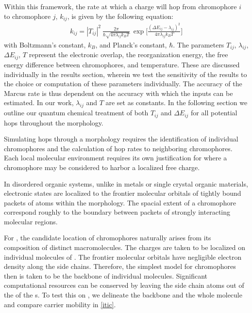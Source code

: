 Within this framework, the rate at which a charge will hop from chromophore $i$ to chromophore $j$, $k_{ij}$,
is given by the following equation:
\begin{align}
    k_{ij}  =  |T_{ij}|^2\ \frac{2\pi}{\hbar \sqrt{4 \pi \lambda_{ij} k_{B} T}}\ \exp{\Bigg[ \frac{(\Delta
    E_{ij} - \lambda_{ij})^2}{ 4 \pi \lambda_{ij} k_{B} T} \Bigg] }
    \label{marcus}
\end{align}
with Boltzmann's constant, $k_{B}$, and Planck's constant, $\hbar$. The parameters $T_{ij}$, $\lambda_{ij}$,
$\Delta E_{ij}$, $T$ represent the electronic overlap, the reorganization energy, the free energy difference
between chromophores, and
temperature. These are discussed individually in the results section, wherein we test the sensitivity of
the  results to the choice or computation of these parameters individually.
The accuracy of the Marcus rate is thus dependent on the accuracy with which the inputs can be estimated. In
our work, $\lambda_{ij}$ and $T$ are set as constants. In
the following section we outline our quantum chemical treatment of both $T_{ij}$ and $\Delta E_{ij}$ for all
potential hops throughout the morphology.

Simulating hops through a morphology requires the identification of
individual chromophores and the calculation of hop rates to neighboring
chromophores. 
Each local molecular environment requires its own justification for where a chromophore 
may be considered to harbor a localized free charge.

In disordered organic systems, unlike in metals or single crystal organic materials, 
electronic states are localized to the frontier molecular orbitals of tightly
bound packets of atoms within the morphology. 
The spacial extent of a chromophore
correspond roughly to the boundary between packets of strongly interacting molecular regions.

For , the candidate location of chromophores naturally arises from its composition of distinct
macromolecules.
The charges are taken to be localized on individual molecules of . The frontier molecular orbitals have 
negligible electron density along the side chains. Therefore, the simplest model for chromophores then is
taken to be the backbone of individual molecules. Significant computational resources 
can be conserved by leaving the side chain atoms out of the of the s. 
To test this on , we delineate the backbone and the whole molecule and compare carrier mobility in \autoref{itic}.
 
